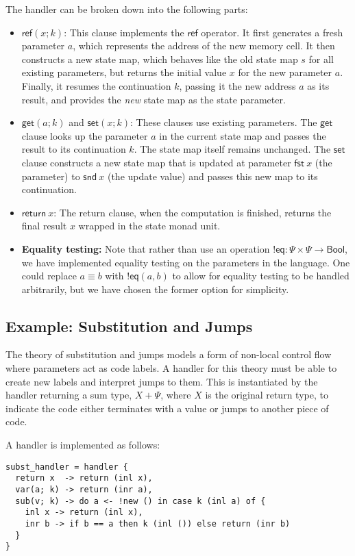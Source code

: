 \documentclass{article}
\theoremstyle{definition}
\theoremstyle{remark}
\newcommand\bool{\mathsf{Bool}}
\newcommand\ret[1]{{\mathsf{return} \ #1}}
\newcommand\get{\mathsf{get}}
\newcommand\set{\mathsf{set}}
\newcommand\newref{\mathsf{ref}}
\newcommand\eq{\mathsf{eq}}
\newcommand\fst[1]{{\mathsf{fst} \ #1}}
\newcommand\snd[1]{{\mathsf{snd} \ #1}}
\newcommand\eff{{!}}
\begin{document}
The handler can be broken down into the following parts:
\begin{itemize}
    \item $\newref(x; k)$: This clause implements the $\newref$ operator.
      It first generates a fresh parameter $a$, which represents the address of the new memory cell.
      It then constructs a new state map, which behaves like the old state map $s$ for all existing parameters, but returns the initial value $x$ for the new parameter $a$.
      Finally, it resumes the continuation $k$, passing it the new address $a$ as its result, and provides the \emph{new} state map as the state parameter.
    \item $\get(a; k)$ and $\set(x; k)$: These clauses use existing parameters.
      The $\get$ clause looks up the parameter $a$ in the current state map and passes the result to its continuation $k$. The state map itself remains unchanged.
      The $\set$ clause constructs a new state map that is updated at parameter $\fst x$ (the parameter) to $\snd x$ (the update value) and passes this new map to its continuation.
    \item $\ret{x}$: The return clause, when the computation is finished, returns the final result $x$ wrapped in the state monad unit.
    \item \textbf{Equality testing:} Note that rather than use an operation $\eff\eq: \Psi \times \Psi \to \bool$, we have implemented equality testing on the parameters in the language.
      One could replace $a\equiv b$ with $\eff\eq(a,b)$ to allow for equality testing to be handled arbitrarily, but we have chosen the former option for simplicity.
\end{itemize}

\subsection{Example: Substitution and Jumps}

The theory of substitution and jumps models a form of non-local control flow where parameters act as code labels.
A handler for this theory must be able to create new labels and interpret jumps to them.
This is instantiated by the handler returning a sum type, $X + \Psi$, where $X$ is the original return type, to indicate the code either terminates with a value or jumps to another piece of code.

A handler is implemented as follows:

\begin{lstlisting}
subst_handler = handler {
  return x  -> return (inl x),
  var(a; k) -> return (inr a),
  sub(v; k) -> do a <- !new () in case k (inl a) of {
    inl x -> return (inl x),
    inr b -> if b == a then k (inl ()) else return (inr b)
  }
}
\end{lstlisting}
\end{document}
